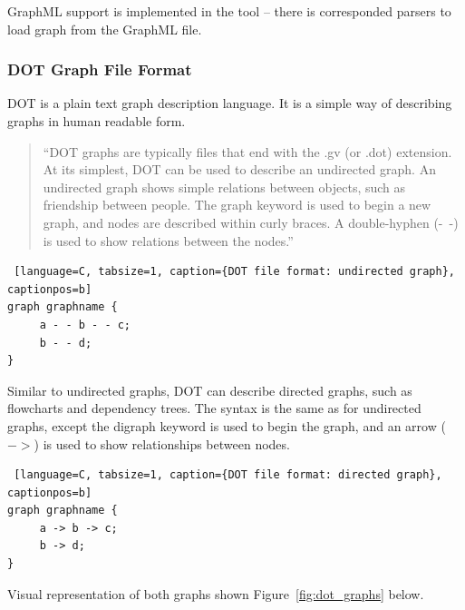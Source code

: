 GraphML support is implemented in the tool -- there is corresponded parsers to load graph from the GraphML file.

\subsubsection{DOT Graph File Format}
DOT is a plain text graph description language. It is a simple way of describing graphs in human readable form.

\begin{quotation}
``DOT graphs are typically files that end with the .gv (or .dot) extension.
At its simplest, DOT can be used to describe an undirected graph.
An undirected graph shows simple relations between objects, such as friendship between people.
The graph keyword is used to begin a new graph, and nodes are described within curly braces.
A double-hyphen (-\ -) is used to show relations between the nodes.''~\cite{DOT}
\end{quotation}

\begin{center}
\renewcommand{\thelstlisting}{\thesection.\arabic{lstlisting}}
\begin{lstlisting} [language=C, tabsize=1, caption={DOT file format: undirected graph}, captionpos=b]
graph graphname {
     a - - b - - c;
     b - - d;
}
\end{lstlisting}
\end{center}

Similar to undirected graphs, DOT can describe directed graphs, such as flowcharts and dependency trees.
The syntax is the same as for undirected graphs, except the digraph keyword is used to begin the graph, and an arrow ($->$) is used to show relationships between nodes.~\cite{DOT}

\begin{center}
\renewcommand{\thelstlisting}{\thesection.\arabic{lstlisting}}
\begin{lstlisting} [language=C, tabsize=1, caption={DOT file format: directed graph}, captionpos=b]
graph graphname {
     a -> b -> c;
     b -> d;
}
\end{lstlisting}
\end{center}

Visual representation of both graphs shown Figure~\ref{fig:dot_graphs} below.

